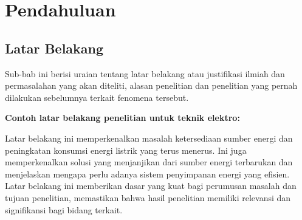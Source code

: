 \chapter{Pendahuluan}

\section{Latar Belakang}

Sub-bab ini berisi uraian tentang latar belakang atau justifikasi ilmiah dan permasalahan yang akan diteliti, alasan penelitian dan penelitian yang pernah dilakukan sebelumnya terkait fenomena tersebut.

\noindent\textbf{Contoh latar belakang penelitian untuk teknik elektro:} \\
\noindent{}

\vspace{5mm}
Latar belakang ini memperkenalkan masalah ketersediaan sumber energi dan 
peningkatan konsumsi energi listrik yang terus menerus. Ini juga memperkenalkan solusi 
yang menjanjikan dari sumber energi terbarukan dan menjelaskan mengapa perlu adanya 
sistem penyimpanan energi yang efisien. Latar belakang ini memberikan dasar yang kuat 
bagi perumusan masalah dan tujuan penelitian, memastikan bahwa hasil penelitian 
memiliki relevansi dan signifikansi bagi bidang terkait.


